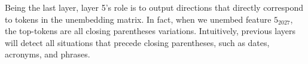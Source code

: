 Being the last layer, layer 5's role is to output directions that directly correspond to tokens in the unembedding matrix. In fact, when we unembed feature $5_{2027}$, the top-tokens are all closing parentheses variations. Intuitively, previous layers will detect all situations that precede closing parentheses, such as dates, acronyms, and phrases.



